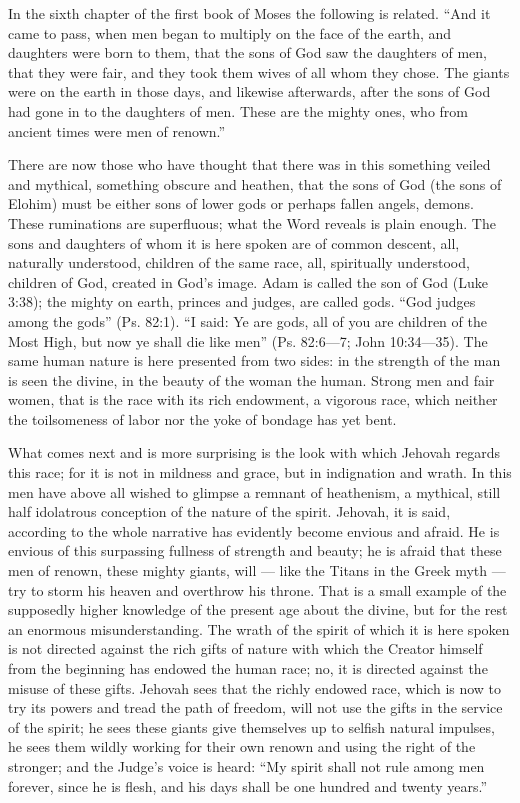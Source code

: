 \documentclass[12pt,a4paper,openany]{book}
\newcommand{\opage}[1]{\marginnote{\footnotesize\textit{[#1]}}}
\begin{document}
In the sixth chapter of the first book of Moses the following is related.
``And it came to pass, when men began to multiply
on the face of the earth, and daughters were born to them, that
the sons of God saw the daughters of men, that they were
fair, and they took them wives of all whom they
chose. The giants were on the earth in those days, and likewise
afterwards, after the sons of God had gone in to
\setcounter{footnote}{0}%
\opage{10}the daughters of men. These are the mighty ones, who from
ancient times were men of renown.''

There are now those who have thought that there was in this something %
veiled and mythical, something obscure and heathen, that
the sons of God (the sons of Elohim) must be either
sons of lower gods or perhaps fallen angels,
demons. These ruminations are superfluous; what the Word
reveals is plain enough. The sons and daughters
of whom it is here spoken are of common descent, all, naturally
understood, children of the same race, all, spiritually understood,
children of God, created in God's image. Adam is called
the son of God (Luke 3:38); the mighty on earth, princes
and judges, are called gods. ``God judges
among the gods'' (Ps. 82:1). ``I said: Ye are
gods, all of you are children of the Most High, but now
ye shall die like men'' (Ps. 82:6---7; John
10:34---35). The same human nature is here
presented from two sides: in the strength of the man is seen the
divine, in the beauty of the woman the human. %
Strong men and fair women, that is the race with
its rich endowment, a vigorous race, which neither the toilsomeness of
labor nor the yoke of bondage has yet
bent.

What comes next and is more surprising is the look
with which Jehovah regards this race; for it is not
in mildness and grace, but in indignation and wrath.
In this men have above all wished to glimpse a remnant of heathenism,
a mythical, still half idolatrous conception of
the nature of the spirit. Jehovah, it is said, according to the whole
narrative has evidently become envious and afraid. He
is envious of this surpassing fullness of strength and
beauty; he is afraid that these men of renown,
\setcounter{footnote}{0}%
\opage{11}these mighty giants, will --- like the Titans
in the Greek myth --- try to storm his
heaven and overthrow his throne. That is a small
example of the supposedly higher knowledge of the present age about
the divine, but for the rest an enormous misunderstanding.
The wrath of the spirit of which it is here spoken is not directed against
the rich gifts of nature with which the Creator
himself from the beginning has endowed the human race;
no, it is directed against the misuse of these gifts. Jehovah sees
that the richly endowed race, which is now to try its
powers and tread the path of freedom, will not use
the gifts in the service of the spirit; he sees these giants
give themselves up to selfish natural impulses, he sees them
wildly working for their own renown and using
the right of the stronger; and the Judge's voice is heard:
``My spirit shall not rule among men forever,
since he is flesh, and his days shall be
one hundred and twenty years.''
\end{document}

